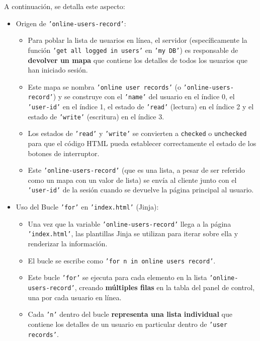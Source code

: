 \documentclass{report}
\begin{document}
A continuación, se detalla este aspecto:
\begin{itemize}
    \item Origen de \texttt{'online-users-record'}:
    \begin{itemize}
        \item Para poblar la lista de usuarios en línea, el servidor (específicamente la función \texttt{'get all logged in users'} en \texttt{'my DB'}) 
        es responsable de \textbf{devolver un mapa} que contiene los detalles de todos los usuarios que han iniciado sesión.
        \item Este mapa se nombra \texttt{'online user records'} (o \texttt{'online-users-record'}) y se construye con el \texttt{'name'} del
              usuario en el índice 0, el \texttt{'user-id'} en el índice 1, el estado de \texttt{'read'} (lectura) en el índice 2 y el estado de 
              \texttt{'write'} (escritura) en el índice 3.
        \item Los estados de \texttt{'read'} y \texttt{'write'} se convierten a \texttt{checked} o \texttt{unchecked} para que el código HTML pueda 
              establecer correctamente el estado de los botones de interruptor.
        \item Este \texttt{'online-users-record'} (que es una lista, a pesar de ser referido como un mapa con un valor de lista) se envía al cliente 
              junto con el \texttt{'user-id'} de la sesión cuando se devuelve la página principal al usuario.
    \end{itemize}

    \item Uso del Bucle \texttt{'for'} en \texttt{'index.html'} (Jinja):
    \begin{itemize}
        \item Una vez que la variable \texttt{'online-users-record'} llega a la página \texttt{'index.html'}, las plantillas Jinja se utilizan para 
        iterar sobre ella y renderizar la información.
        \item El bucle se escribe como \texttt{'for n in online users record'}.
        \item Este bucle \texttt{'for'} se ejecuta para cada elemento en la lista \texttt{'online-users-record'}, creando \textbf{múltiples filas} 
        en la tabla del panel de control, una por cada usuario en línea.
        \item Cada \texttt{'n'} dentro del bucle \textbf{representa una lista individual} que contiene los detalles de un usuario en particular dentro 
        de \texttt{'user records'}.    
    \end{itemize}


\end{itemize}
\end{document}

